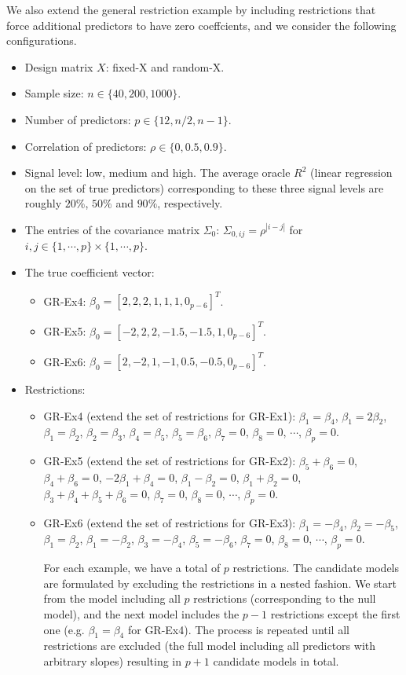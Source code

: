 \documentclass{article}
\begin{document}
We also extend the general restriction example by including restrictions that force additional
predictors to have zero coeffcients, and we consider the following configurations.
\begin{itemize}
  \item Design matrix $X$: fixed-X and random-X.
  \item Sample size: $n \in \{40, 200, 1000\}$.
  \item Number of predictors: $p \in \{12, n/2, n-1\}$.
  \item Correlation of predictors: $\rho \in \{0,0.5,0.9\}$.
  \item Signal level: low, medium and high. The average oracle $R^2$ (linear regression on the set of true predictors) corresponding to these three signal levels are roughly $20\%$, $50\%$ and $90\%$, respectively.
  \item The entries of the covariance matrix $\Sigma_0$: $\Sigma_{0,ij}=\rho^{|i-j|}$ for $i,j\in\{1,\cdots,p\}\times\{1,\cdots,p\}$.
  \item The true coefficient vector:
  \begin{itemize}
    \item GR-Ex4: $\beta_0 = [2,2,2,1,1,1,0_{p-6}]^T$. 
    \item GR-Ex5: $\beta_0 = [-2,2,2,-1.5,-1.5,1,0_{p-6}]^T$.
    \item GR-Ex6: $\beta_0 = [2,-2,1,-1,0.5,-0.5,0_{p-6}]^T$.
  \end{itemize}
  \item Restrictions:
  \begin{itemize}
    \item GR-Ex4 (extend the set of restrictions for GR-Ex1): $\beta_1=\beta_4$, $\beta_1=2\beta_2$, $\beta_1=\beta_2$, $\beta_2=\beta_3$, $\beta_4=\beta_5$, $\beta_5=\beta_6$, $\beta_7=0$, $\beta_8=0$, $\cdots$, $\beta_p=0$.

    \item GR-Ex5 (extend the set of restrictions for GR-Ex2): $\beta_5+\beta_6=0$, $\beta_4+\beta_6=0$, $-2\beta_1+\beta_4=0$, $\beta_1-\beta_2=0$, $\beta_1+\beta_2=0$, $\beta_3+\beta_4+\beta_5+\beta_6=0$, $\beta_7=0$, $\beta_8=0$, $\cdots$, $\beta_p=0$.

    \item GR-Ex6 (extend the set of restrictions for GR-Ex3): $\beta_1=-\beta_4$, $\beta_2=-\beta_5$, $\beta_1=\beta_2$, $\beta_1=-\beta_2$, $\beta_3=-\beta_4$, $\beta_5=-\beta_6$, $\beta_7=0$, $\beta_8=0$, $\cdots$, $\beta_p=0$.

    For each example, we have a total of $p$ restrictions. The candidate models are formulated by excluding the restrictions in a nested fashion. We start from the model including all $p$ restrictions (corresponding to the null model), and the next model includes the $p-1$ restrictions except the first one (e.g. $\beta_1=\beta_4$ for GR-Ex4). The process is repeated until all restrictions are excluded (the full model including all predictors with arbitrary slopes) resulting in $p + 1$ candidate models in total.
  \end{itemize}
\end{itemize}
\end{document}
